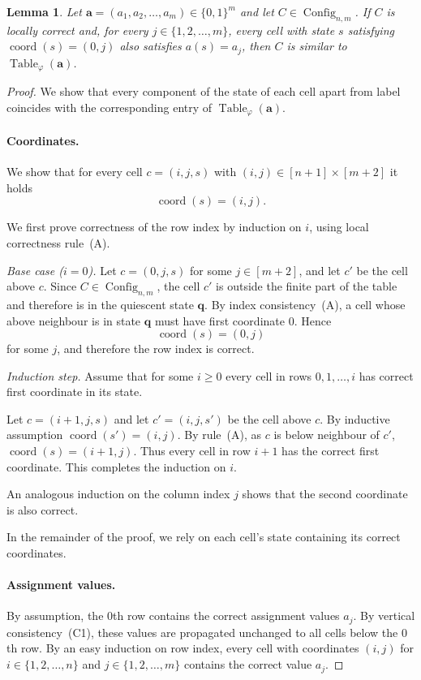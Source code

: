 \documentclass{article}
\theoremstyle{plain}
\newtheorem{lemma}[theorem]{Lemma}
\theoremstyle{definition}
\DeclareMathOperator{\Config}{Config}
\DeclareMathOperator{\Table}{Table}
\DeclareMathOperator{\coord}{coord}
\newcommand{\tuple}{\mathbf}
\begin{document}
\begin{lemma}\label{lm:new_lemma}
Let $\tuple a=(a_1,a_2,\dots,a_m)\in\{0,1\}^m$ and let
$C\in\Config_{n,m}$.
If $C$ is locally correct and, for every $j\in\{1,2,\dots,m\}$, every cell
with state $s$ satisfying $\coord(s)=(0,j)$ also satisfies $a(s)=a_j$, then
$C$ is similar to $\Table_\varphi(\tuple a)$.
\end{lemma}

\begin{proof}
We show that every component of the state of each cell apart from label coincides with the corresponding entry
of $\Table_\varphi(\tuple a)$.

\paragraph{Coordinates.}
We show that for every cell $c=(i,j,s)$ with 
$(i,j)\in [n+1]\times[m+2]$ it holds
\[
\coord(s)=(i,j).
\]

We first prove correctness of the row index by induction on $i$,
using local correctness rule~(A).

\medskip
\noindent
\emph{Base case ($i=0$).}
Let $c=(0,j,s)$ for some $j\in[m+2]$, and let $c'$ be the cell above
$c$. Since $C\in\Config_{n,m}$, the cell $c'$ is outside the finite
part of the table and therefore is in the quiescent state $\tuple q$.
By index consistency~(A), a cell whose above neighbour is in state
$\tuple q$ must have first coordinate $0$. Hence
\[
\coord(s)=(0,j)
\]
for some $j$, and therefore the row index is correct.

\medskip
\noindent
\emph{Induction step.}
Assume that for some $i\ge 0$ every cell in rows $0, 1, \dots, i$ has correct
first coordinate in its state. 

Let $c=(i+1,j,s)$ and let $c'=(i,j,s')$ be the
cell above $c$.  By inductive assumption $\coord(s') = (i,j)$. By rule~(A), as $c$ is below neighbour of $c'$, $\coord(s) =(i+1, j)$. 
Thus every cell in row $i+1$ has the correct first coordinate.
This completes the induction on $i$.

An analogous induction on the column index $j$ shows that the second
coordinate is also correct. 

In the remainder of the proof, we rely on each cell’s state containing its correct coordinates.


\paragraph{Assignment values.}
By assumption, the $0$th row contains the correct assignment values $a_j$.
By vertical consistency~(C1), these values are propagated unchanged to all cells
below the $0$th row. By an easy induction on row index, every cell with coordinates $(i,j)$ for $i \in \{1, 2, \dots, n\}$ and $j \in \{1, 2, \dots, m\}$ contains the
correct value $a_j$.


\end{proof}
\end{document}
